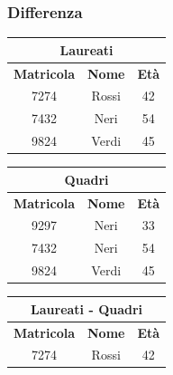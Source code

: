 \documentclass[../main.tex]{subfiles}
\begin{document}
	\subsubsection{Differenza}
	\begin{center}
		\begin{tabular}{ |c|c|c| }
			\hline
			\multicolumn{3}{|c|}{\textbf{Laureati}}\\
			\hline
			\textbf{Matricola} & \textbf{Nome} & \textbf{Età}\\
			\hline
			7274 & Rossi & 42\\
			7432 & Neri & 54\\
			9824 & Verdi & 45\\
			\hline
		\end{tabular}
		\begin{tabular}{|c|c|c|}
			\hline
			\multicolumn{3}{|c|}{\textbf{Quadri}}\\
			\hline
			\textbf{Matricola} & \textbf{Nome} & \textbf{Età}\\
			\hline
			9297 & Neri & 33\\
			7432 & Neri & 54\\
			9824 & Verdi & 45\\
			\hline
		\end{tabular}
	\end{center}
	\begin{center}
		\begin{tabular}{|c|c|c|}
			\hline
			\multicolumn{3}{|c|}{\textbf{Laureati - Quadri}}\\
			\hline
			\textbf{Matricola} & \textbf{Nome} & \textbf{Età}\\
			\hline
			7274 & Rossi & 42\\
			\hline
		\end{tabular}
	\end{center}
\end{document}
